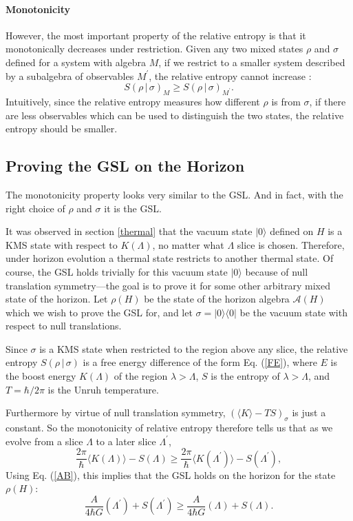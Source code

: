 \documentclass[12pt]{article}
\begin{document}
\paragraph{Monotonicity} However, the most important property of the relative entropy is that it monotonically decreases under restriction.  Given any two mixed states $\rho$ and $\sigma$ defined for a system with algebra $M$, if we restrict to a smaller system described by a subalgebra of observables $M^\prime$, the relative entropy cannot increase \cite{lindblad75}:
\begin{equation}
S(\rho\,|\,\sigma)_M \ge S(\rho\,|\,\sigma)_{M^\prime}.
\end{equation}
Intuitively, since the relative entropy measures how different $\rho$ is from $\sigma$, if there are less observables which can be used to distinguish the two states, the relative entropy should be smaller.

\subsection{Proving the GSL on the Horizon}\label{proofon}

The monotonicity property looks very similar to the GSL.  And in fact, with the right choice of $\rho$ and $\sigma$ it is the GSL.

It was observed in section \ref{thermal} that the vacuum state $|0\rangle$ defined on $H$ is a KMS state with respect to $K(\Lambda)$, no matter what $\Lambda$ slice is chosen.  Therefore, under horizon evolution a thermal state restricts to another thermal state.  Of course, the GSL holds trivially for this vacuum state $|0\rangle$ because of null translation symmetry---the goal is to prove it for some other arbitrary mixed state of the horizon.  Let $\rho(H)$ be the state of the horizon algebra $\mathcal{A}(H)$ which we wish to prove the GSL for, and let $\sigma = | 0 \rangle \langle 0 |$ be the vacuum state with respect to null translations.

Since $\sigma$ is a KMS state when restricted to the region above any slice, the relative entropy $S(\rho\,|\,\sigma)$ is a free energy difference of the form Eq. (\ref{FE}), where $E$ is the boost energy $K(\Lambda)$ of the region $\lambda > \Lambda$, $S$ is the entropy of $\lambda > \Lambda$, and $T = \hbar/{2\pi}$ is the Unruh temperature.

Furthermore by virtue of null translation symmetry, $(\langle K \rangle - TS)_\sigma$ is just a constant.  So the monotonicity of relative entropy therefore tells us that as we evolve from a slice $\Lambda$ to a later slice $\Lambda^\prime$,
\begin{equation}
\frac{2\pi}{\hbar} \langle K(\Lambda) \rangle - S(\Lambda) \ge
\frac{2\pi}{\hbar} \langle K(\Lambda^\prime) \rangle - S(\Lambda^\prime),
\end{equation}
Using Eq. (\ref{AB}), this implies that the GSL holds on the horizon for the state $\rho(H)$:
\begin{equation}
\frac{A}{4\hbar G}(\Lambda^\prime) + S(\Lambda^\prime) \ge \frac{A}{4\hbar G}(\Lambda) + S(\Lambda).
\end{equation}
\end{document}

